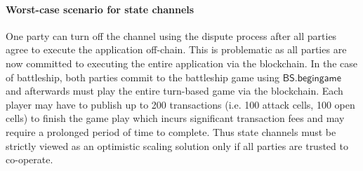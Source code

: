 \documentclass{llncs}
\newcommand{\cmark}{\ding{51}}%
\newcommand{\xmark}{\ding{55}}%
\newcommand{\battleshipbegin}{\mathsf{BS.begingame}}
\begin{document}
%


\paragraph{Worst-case scenario for state channels} 

One party can turn off the channel using the dispute process after all parties agree to execute the application off-chain.   
This is problematic as all parties are now committed to executing the entire application via the blockchain.
In the case of battleship, both parties commit to the battleship game using $\battleshipbegin$ and afterwards must play the entire turn-based game via the blockchain. 
Each player may have to publish up to 200 transactions (i.e. 100 attack cells, 100 open cells) to finish the game play which incurs significant transaction fees and may require a prolonged period of time to complete. 
Thus state channels must be strictly viewed as an optimistic scaling solution only if all parties are trusted to co-operate.  
\end{document}
